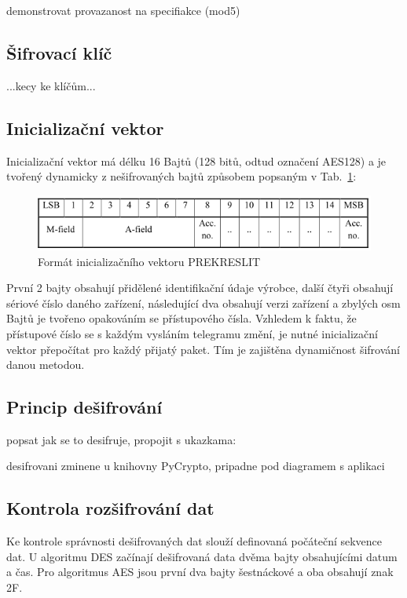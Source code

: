 \colorbox[rgb]{1,0,0}{demonstrovat provazanost na specifiakce (mod5)}

\subsection{Šifrovací klíč}
\colorbox[rgb]{1,0,0}{...kecy ke klíčům...}

\subsection{Inicializační vektor}
Inicializační vektor má délku 16 Bajtů (128 bitů, odtud označení AES128) a je tvořený dynamicky z nešifrovaných bajtů způsobem popsaným v Tab.~\ref{TabulkaInicializacniVektor}:
\begin{figure}[!h]
 \begin{center}
    \includegraphics[scale=0.9]{obrazky/sifrovani_vektor}
  \end{center}
  \caption{Formát inicializačního vektoru \colorbox[rgb]{1,0,0}{PREKRESLIT}}
	\label{TabulkaInicializacniVektor}
\end{figure}

První 2 bajty obsahují přidělené identifikační údaje výrobce, další čtyři obsahují sériové číslo daného zařízení, následující dva obsahují verzi zařízení a zbylých osm Bajtů je tvořeno opakováním se přístupového čísla. Vzhledem k faktu, že přístupové číslo se s každým vysláním telegramu změní, je nutné inicializační vektor přepočítat pro každý přijatý paket. Tím je zajištěna dynamičnost šifrování danou metodou.

\subsection{Princip dešifrování}

\colorbox[rgb]{1,0,0}{popsat jak se to desifruje, propojit s ukazkama:}

 \colorbox[rgb]{1,0,0}{desifrovani zminene u knihovny PyCrypto, pripadne pod diagramem s aplikaci}


\subsection{Kontrola rozšifrování dat}
Ke kontrole správnosti dešifrovaných dat slouží definovaná počáteční sekvence dat. U algoritmu DES začínají dešifrovaná data dvěma bajty obsahujícími datum a čas. Pro algoritmus AES jsou první dva bajty šestnáckové a oba obsahují znak 2F.



















